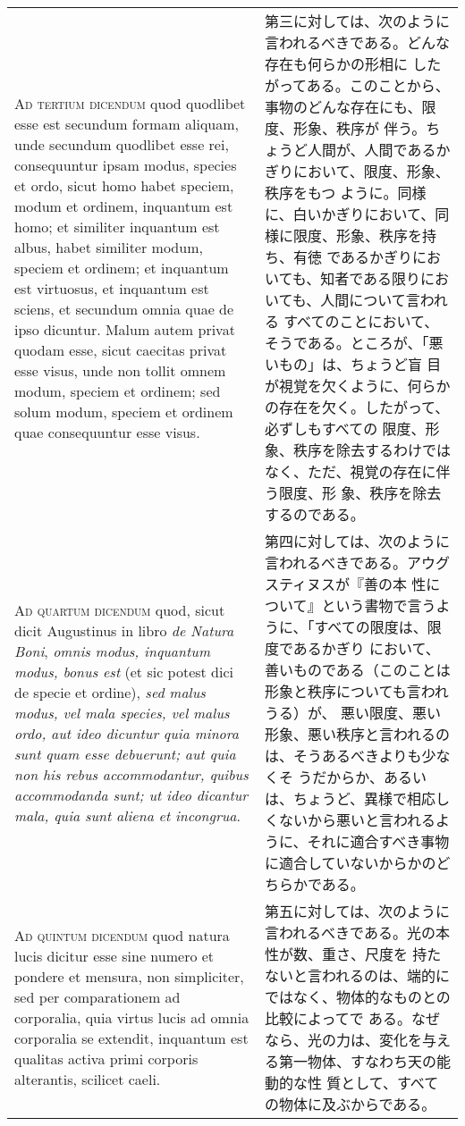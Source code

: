 \documentclass[10pt]{jsarticle} %
\begin{document}
\begin{longtable}{p{21em}p{21em}}
\\

{\scshape Ad tertium dicendum} quod quodlibet esse est secundum formam
 aliquam, unde secundum quodlibet esse rei, consequuntur ipsam modus,
 species et ordo, sicut homo habet speciem, modum et ordinem, inquantum
 est homo; et similiter inquantum est albus, habet similiter modum,
 speciem et ordinem; et inquantum est virtuosus, et inquantum est
 sciens, et secundum omnia quae de ipso dicuntur. Malum autem privat
 quodam esse, sicut caecitas privat esse visus, unde non tollit omnem
 modum, speciem et ordinem; sed solum modum, speciem et ordinem quae
 consequuntur esse visus.

&


第三に対しては、次のように言われるべきである。どんな存在も何らかの形相に
 したがってある。このことから、事物のどんな存在にも、限度、形象、秩序が
 伴う。ちょうど人間が、人間であるかぎりにおいて、限度、形象、秩序をもつ
 ように。同様に、白いかぎりにおいて、同様に限度、形象、秩序を持ち、有徳
 であるかぎりにおいても、知者である限りにおいても、人間について言われる
 すべてのことにおいて、そうである。ところが、「悪いもの」は、ちょうど盲
 目が視覚を欠くように、何らかの存在を欠く。したがって、必ずしもすべての
 限度、形象、秩序を除去するわけではなく、ただ、視覚の存在に伴う限度、形
 象、秩序を除去するのである。

\\

{\scshape Ad quartum dicendum} quod, sicut dicit Augustinus in libro
 {\itshape de Natura Boni}, {\itshape omnis modus, inquantum modus,
 bonus est} (et sic potest dici de specie et ordine), {\itshape sed
 malus modus, vel mala species, vel malus ordo, aut ideo dicuntur quia
 minora sunt quam esse debuerunt; aut quia non his rebus accommodantur,
 quibus accommodanda sunt; ut ideo dicantur mala, quia sunt aliena et
 incongrua}.

&

第四に対しては、次のように言われるべきである。アウグスティヌスが『善の本
 性について』という書物で言うように、「すべての限度は、限度であるかぎり
 において、善いものである（このことは形象と秩序についても言われうる）が、
 悪い限度、悪い形象、悪い秩序と言われるのは、そうあるべきよりも少なくそ
 うだからか、あるいは、ちょうど、異様で相応しくないから悪いと言われるよ
 うに、それに適合すべき事物に適合していないからかのどちらかである。


\\

{\scshape Ad quintum dicendum} quod natura lucis dicitur esse sine numero et
 pondere et mensura, non simpliciter, sed per comparationem ad
 corporalia, quia virtus lucis ad omnia corporalia se extendit,
 inquantum est qualitas activa primi corporis alterantis, scilicet
 caeli.

&


第五に対しては、次のように言われるべきである。光の本性が数、重さ、尺度を
 持たないと言われるのは、端的にではなく、物体的なものとの比較によってで
 ある。なぜなら、光の力は、変化を与える第一物体、すなわち天の能動的な性
 質として、すべての物体に及ぶからである。



\end{longtable}
\end{document}
